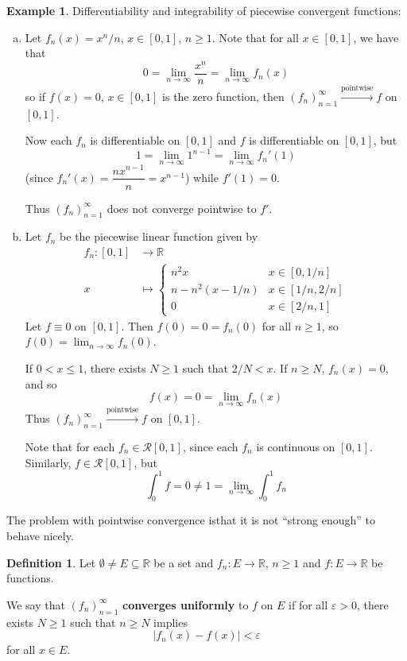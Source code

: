 \documentclass[11pt]{article}
\theoremstyle{definition}
\newtheorem{defn}[thm]{Definition}
\newtheorem{exmp}[thm]{Example}
\newcommand{\mbR}{\ensuremath{\mathbb{R}}}
\begin{document}
\begin{exmp}
Differentiability and integrability of piecewise convergent functions:
\begin{enumerate}[(a)]  \vspace{-0.2cm}

\item Let $f_n(x) = x^n / n$, $x \in [0, 1]$, $n \geq 1$. Note that for all $x \in [0, 1]$, we have that
$$0 = \lim_{n\to\infty} \frac{x^n}n = \lim_{n\to\infty} f_n(x)$$
so if $f(x) = 0$, $x \in [0, 1]$ is the zero function, then $(f_n)_{n=1}^\infty \xrightarrow{\text{pointwise}} f$ on $[0, 1]$. 

Now each $f_n$ is differentiable on $[0, 1]$ and $f$ is differentiable on $[0, 1]$, but
$$1 = \lim_{n\to\infty} 1^{n-1} = \lim_{n\to\infty} f_n'(1)$$
(since $f_n'(x) = \dfrac{nx^{n-1}}n = x^{n-1}$) while $f'(1) = 0$. 

Thus $(f_n)_{n=1}^\infty$ does not converge pointwise to $f'$. 

\item Let $f_n$ be the piecewise linear function given by 
\begin{align*}
f_n : [0, 1] & \to \mbR \\
x & \mapsto \begin{cases} n^2x & x \in [0, 1/n] \\ n - n^2(x - 1/n) & x \in [1/n, 2/n] \\ 0 & x \in [2/n, 1] \end{cases}
\end{align*}
Let $f \equiv 0$ on $[0, 1]$. Then $f(0) = 0 = f_n(0)$ for all $n \geq 1$, so $f(0) = \lim_{n\to\infty} f_n(0)$.

If $0 < x \leq 1$, there exists $N \geq 1$ such that $2/N < x$. If $n \geq N$, $f_n(x) = 0$, and so
$$f(x) = 0 = \lim_{n\to\infty} f_n(x)$$
Thus $(f_n)_{n=1}^\infty \xrightarrow{\text{pointwise}} f$ on $[0, 1]$.

Note that for each $f_n \in \mathcal{R}[0, 1]$, since each $f_n$ is continuous on $[0, 1]$. Similarly, $f \in \mathcal{R}[0, 1]$, but
$$\int_0^1 f = 0 \ne 1 = \lim_{n\to\infty} \int_0^1 f_n$$
\end{enumerate}
\end{exmp}

The problem with pointwise convergence isthat it is not ``strong enough'' to behave nicely. 

\begin{defn}
Let $\emptyset \ne E \subseteq \mbR$ be a set and $f_n : E \to \mbR$, $n \geq 1$ and $f : E \to \mbR$ be functions.

We say that $(f_n)_{n=1}^\infty$ \textbf{converges uniformly} to $f$ on $E$ if for all $\varepsilon > 0$, there exists $N \geq 1$ such that $n \geq N$ implies
$$|f_n(x) - f(x)| < \varepsilon$$
for all $x \in E$.
\end{defn}
\end{document}
